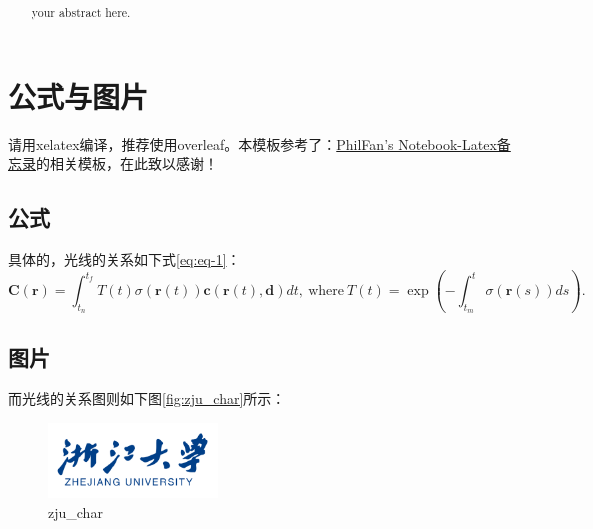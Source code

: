 \documentclass[12pt,a4paper,UTF8]{ctexart}
\begin{document}
\cover
\thispagestyle{empty} %

\newpage
\setcounter{page}{1}%


\begin{center}
    \title{\Huge \textcolor[rgb]{0, 0.44, 0.75}{\textbf{\themytitle}}}
\end{center}

\begin{abstract}
your abstract here.
\end{abstract}




\section{公式与图片}
请用xelatex编译，推荐使用overleaf。本模板参考了：\href{https://www.philfan.cn/Tools/latex/#overleaf}{PhilFan's Notebook-Latex备忘录}的相关模板，在此致以感谢！

\subsection{公式}
具体的，光线的关系如下式\eqref{eq:eq-1}：
\begin{equation}
\mathbf{C}(\mathbf{r})=\int_{t_n}^{t_f}T(t)\sigma(\mathbf{r}(t))\mathbf{c}(\mathbf{r}(t),\mathbf{d})dt,\mathrm{~where~}T(t)=\exp\left(-\int_{t_m}^t\sigma(\mathbf{r}(s))ds\right).
\label{eq:eq-1}
\end{equation}

\subsection{图片}
而光线的关系图则如下图\eqref{fig:zju_char}所示：
\begin{figure}[hb]
  \centering
  \includegraphics[width=0.4\textwidth]{figures/zju_char.png}
  \caption{zju\_char\cite{mildenhall_nerf_2020}}
  \label{fig:zju_char}
\end{figure}

\newpage
{}
\end{document}
